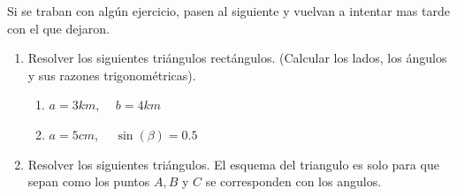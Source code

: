 \documentclass[a4paper,11pt,spanish,sans]{exam}
\begin{document}
	Si se traban con algún ejercicio, pasen al siguiente y vuelvan a intentar mas tarde con el que dejaron.
	
	\begin{enumerate}
		
		\item Resolver los siguientes triángulos rectángulos. (Calcular los lados, los ángulos y sus razones trigonométricas). \label{rectangulos}\\
		
		\begin{minipage}{0.45\linewidth}
			
			
		\end{minipage}
		\begin{minipage}{0.55\linewidth}
			\begin{enumerate}
				\item $a=3km$,  $\quad b=4km$ 		
				\item $a=5cm$, $\quad \sin(\beta)=0.5$
		\end{enumerate}
	\end{minipage}
	
	\item Resolver los siguientes triángulos. El esquema del triangulo es solo para que sepan como los puntos $A,B$ y $C$ se corresponden con los angulos. \label{obtusos}
	

\end{enumerate}
\end{document}
